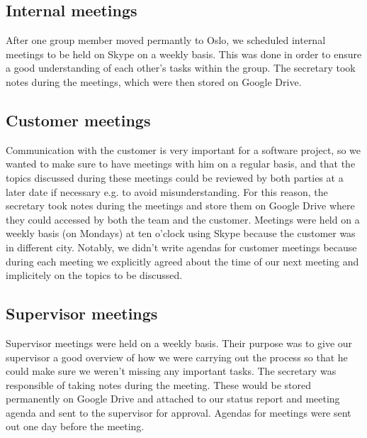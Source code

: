 \subsection{Internal meetings}
After one group member moved permantly to Oslo, we scheduled internal meetings to be held on Skype
on a weekly basis. This was done in order to ensure a good understanding of each other's tasks within the group.
The secretary took notes during the meetings, which were then stored on Google Drive.

\subsection{Customer meetings}
Communication with the customer is very important for a software project, so we wanted to make sure to have meetings
with him on a regular basis, and that the topics discussed during these meetings could be reviewed by
both parties at a later date if necessary e.g. to avoid misunderstanding.
For this reason, the secretary took notes during the meetings and store them on Google Drive where they
could accessed by both the team and the customer. Meetings were held on a weekly basis (on Mondays) at ten o'clock using
Skype because the customer was in different city.
Notably, we didn't write agendas for customer meetings because during each meeting we explicitly
agreed about the time of our next meeting and implicitely on the topics to be discussed.



\subsection{Supervisor meetings}
Supervisor meetings were held on a weekly basis.%
Their purpose was to give our supervisor a good overview of how we were carrying out the process
so that he could make sure we weren't missing any important tasks. The secretary was responsible of taking notes
during the meeting. These would be stored permanently on Google Drive and attached to our status report and
meeting agenda and sent to the supervisor for approval.
Agendas for meetings were sent out one day before the meeting.

